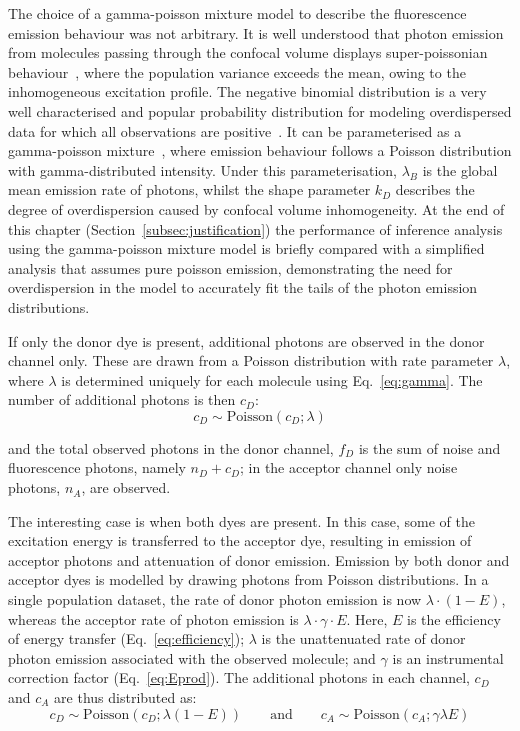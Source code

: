 The choice of a gamma-poisson mixture model to describe the fluorescence emission behaviour was not arbitrary. It is well understood that photon emission from molecules passing through the confocal volume displays super-poissonian behaviour~\cite{chen99}, where the population variance exceeds the mean, owing to the inhomogeneous excitation profile. The negative binomial distribution is a very well characterised and popular probability distribution for modeling overdispersed data for which all observations are positive~\cite{lloydsmith07, bliss53}. It can be parameterised as a gamma-poisson mixture~\cite{lloydsmith07}, where emission behaviour follows a Poisson distribution with gamma-distributed intensity. Under this parameterisation, $\lambda_B$ is the global mean emission rate of photons, whilst the shape parameter $k_D$ describes the degree of overdispersion caused by confocal volume inhomogeneity. At the end of this chapter (Section~\ref{subsec:justification}) the performance of inference analysis using the gamma-poisson mixture model is briefly compared with a simplified analysis that assumes pure poisson emission, demonstrating the need for overdispersion in the model to accurately fit the tails of the photon emission distributions.  

If only the donor dye is present, additional photons are observed in the donor channel only. These are drawn from a Poisson distribution with rate parameter $\lambda$, where $\lambda$ is determined uniquely for each molecule using Eq.~\ref{eq:gamma}. The number of additional photons is then $c_D$:
\begin{equation}
c_D \sim \text{Poisson}(c_{D}; \lambda)
\end{equation}

and the total observed photons in the donor channel, $f_D$ is the sum of noise and fluorescence photons, namely $n_D + c_D$; in the acceptor channel only noise photons, $n_A$, are observed.

The interesting case is when both dyes are present.  In this case, some of the excitation energy is transferred to the acceptor dye, resulting in emission of acceptor photons and attenuation of donor emission.  Emission by both donor and acceptor dyes is modelled by drawing photons from Poisson distributions. In a single population dataset, the rate of donor photon emission is now $\lambda\cdot(1-E)$, whereas the acceptor rate of photon emission is $\lambda \cdot \gamma \cdot E$. Here, $E$ is the efficiency of energy transfer (Eq.~\ref{eq:efficiency}); $\lambda$ is the unattenuated rate of donor photon emission associated with the observed molecule; and $\gamma$ is an instrumental correction factor (Eq.~\ref{eq:Eprod}). The additional photons in each channel, $c_D$ and $c_A$ are thus distributed as:
\begin{equation}
c_D \sim \text{Poisson}(c_D; \lambda (1-E)) \qquad \text{and} \qquad c_A \sim \text{Poisson}(c_A; \gamma \lambda E)
\end{equation}

